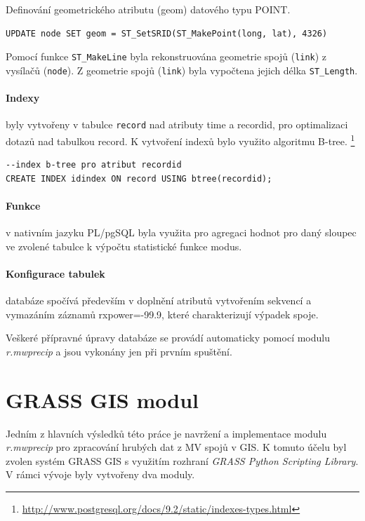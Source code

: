 \documentclass[a4paper,12pt,oneside]{report}
\begin{document}
Definování geometrického atributu (geom) datového typu POINT. 

\begin{footnotesize}
\begin{lstlisting}[style=mybash]
UPDATE node SET geom = ST_SetSRID(ST_MakePoint(long, lat), 4326)
\end{lstlisting}
\end{footnotesize}

Pomocí funkce \texttt{ST\_MakeLine} byla rekonstruována geometrie spojů (\texttt{link}) z vysílačů (\texttt{node}). Z geometrie spojů (\texttt{link}) byla vypočtena jejich délka \texttt{ST\_Length}.

\paragraph*{Indexy} byly vytvořeny v tabulce \texttt{record} nad atributy time a recordid, pro optimalizaci dotazů nad tabulkou record. K vytvoření indexů bylo využito algoritmu B-tree. \footnote{\url{http://www.postgresql.org/docs/9.2/static/indexes-types.html}}

\begin{footnotesize}
\begin{lstlisting}[style=mybash]
--index b-tree pro atribut recordid
CREATE INDEX idindex ON record USING btree(recordid);		
\end{lstlisting}
\end{footnotesize}

\paragraph*{Funkce} v nativním jazyku PL/pgSQL byla využita pro agregaci hodnot pro daný sloupec ve zvolené tabulce k výpočtu statistické funkce modus.

\paragraph*{Konfigurace tabulek} databáze spočívá především v doplnění atributů vytvořením sekvencí a vymazáním záznamů rxpower=-99.9, které charakterizují výpadek spoje. 

\bigskip

Veškeré přípravné úpravy databáze se provádí automaticky pomocí modulu \textit{r.mwprecip} a jsou vykonány jen při prvním spuštění. 

\section{GRASS GIS modul}
Jedním z hlavních výsledků této práce je navržení a implementace modulu \textit{r.mwprecip} pro zpracování hrubých dat z MV spojů v GIS. K tomuto účelu byl zvolen systém GRASS GIS s využitím rozhraní \textit{GRASS Python Scripting Library}. V rámci vývoje byly vytvořeny dva moduly.
\end{document}

